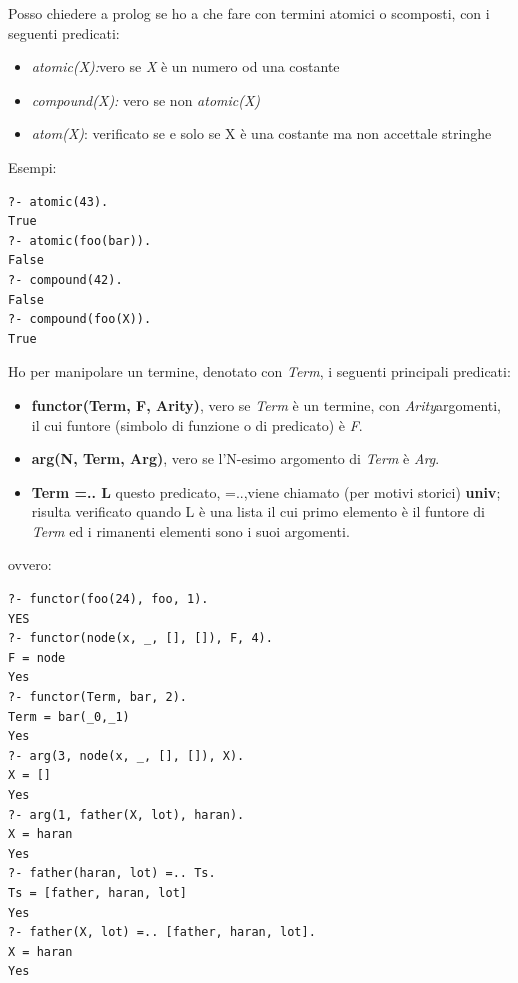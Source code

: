 Posso chiedere a prolog se ho a che fare con termini atomici o scomposti, con i seguenti predicati:
\begin{itemize}
\item \textit{atomic(X):}vero se \textit{X} è un numero od una costante
\item \textit{compound(X):} vero se non \textit{atomic(X)}
\item \textit{atom(X)}: verificato se e solo se X è una costante ma non accettale stringhe
\end{itemize}
Esempi:
\begin{verbatim}
?- atomic(43).
True
?- atomic(foo(bar)).
False
?- compound(42).
False
?- compound(foo(X)).
True
\end{verbatim}
Ho per manipolare un termine, denotato con \emph{Term}, i seguenti principali predicati:
\begin{itemize}
\item \textbf{functor(Term, F, Arity)},
vero se \emph{Term} è un termine, con \emph{Arity}argomenti, il cui funtore (simbolo di funzione o di predicato) è \emph{F}.
\item \textbf{arg(N, Term, Arg)},
vero se l’N-esimo argomento di \emph{Term }è \emph{Arg}.
\item \textbf{Term =.. L}
  questo predicato, =..,viene chiamato (per motivi storici) \textbf{univ}; risulta verificato quando L è una lista
  il cui primo elemento è il funtore di \textit{Term} ed i rimanenti elementi sono i suoi argomenti.
\end{itemize}
ovvero:
\begin{verbatim}
?- functor(foo(24), foo, 1).
YES
?- functor(node(x, _, [], []), F, 4).
F = node
Yes
?- functor(Term, bar, 2).
Term = bar(_0,_1)
Yes
?- arg(3, node(x, _, [], []), X).
X = []
Yes
?- arg(1, father(X, lot), haran).
X = haran
Yes
?- father(haran, lot) =.. Ts.
Ts = [father, haran, lot]
Yes
?- father(X, lot) =.. [father, haran, lot].
X = haran
Yes
\end{verbatim}
